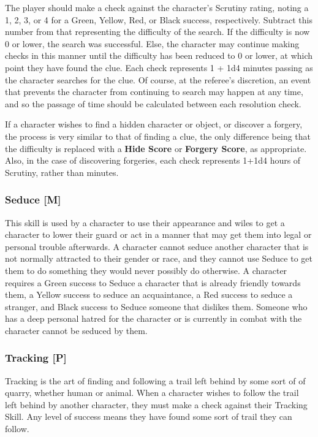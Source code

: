 \documentclass[oneside]{book}
\begin{document}
\begin{multicols}{2}
 The player should make a check against the character's Scrutiny rating, noting a 1, 2, 3, or 4 for a Green, Yellow, Red, or Black success, respectively. Subtract this number from that representing the difficulty of the search. If the difficulty is now 0 or lower, the search was successful. Else, the character may continue making checks in this manner until the difficulty has been reduced to 0 or lower, at which point they have found the clue. Each check represents 1 + 1d4 minutes passing as the character searches for the clue. Of course, at the referee's discretion, an event that prevents the character from continuing to search may happen at any time, and so the passage of time should be calculated between each resolution check. 

If a character wishes to find a hidden character or object, or discover a forgery, the process is very similar to that of finding a clue, the only difference being that the difficulty is replaced with a \textbf{Hide Score} or \textbf{Forgery Score}, as appropriate. Also, in the case of discovering forgeries, each check represents 1+1d4 hours of Scrutiny, rather than minutes. 

\subsubsection{Seduce [M]}
This skill is used by a character to use their appearance and wiles to get a character to lower their guard or act in a manner that may get them into legal or personal trouble afterwards. A character cannot seduce another character that is not normally attracted to their gender or race, and they cannot use Seduce to get them to do something they would never possibly do otherwise. A character requires a Green success to Seduce a character that is already friendly towards them, a Yellow success to seduce an acquaintance, a Red success to seduce a stranger, and Black success to Seduce someone that dislikes them. Someone who has a deep personal hatred for the character or is currently in combat with the character cannot be seduced by them.

\subsubsection{Tracking [P]}
Tracking is the art of finding and following a trail left behind by some sort of of quarry, whether human or animal. When a character wishes to follow the trail left behind by another character, they must make a check against their Tracking Skill. Any level of success means they have found some sort of trail they can follow.


\end{multicols}
\end{document}
